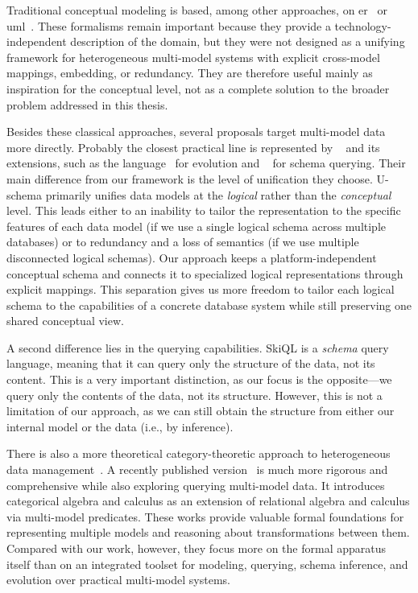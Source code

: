 Traditional conceptual modeling is based, among other approaches, on \acrshort{er}~\citep{ER} or \acrshort{uml}~\citep{UML}. These formalisms remain important because they provide a technology-independent description of the domain, but they were not designed as a unifying framework for heterogeneous multi-model systems with explicit cross-model mappings, embedding, or redundancy. They are therefore useful mainly as inspiration for the conceptual level, not as a complete solution to the broader problem addressed in this thesis.

Besides these classical approaches, several proposals target multi-model data more directly. Probably the closest practical line is represented by ~\citep{DBLP:journals/is/CandelRM22} and its extensions, such as the  language~\citep{DBLP:conf/er/ChillonRM21a, 10.1109/TKDE.2024.3362273} for evolution and ~\citep{skiql} for schema querying. Their main difference from our framework is the level of unification they choose. U-schema primarily unifies data models at the \emph{logical} rather than the \emph{conceptual} level. This leads either to an inability to tailor the representation to the specific features of each data model (if we use a single logical schema across multiple databases) or to redundancy and a loss of semantics (if we use multiple disconnected logical schemas). Our approach keeps a platform-independent conceptual schema and connects it to specialized logical representations through explicit mappings. This separation gives us more freedom to tailor each logical schema to the capabilities of a concrete database system while still preserving one shared conceptual view.

A second difference lies in the querying capabilities. SkiQL is a \emph{schema} query language, meaning that it can query only the structure of the data, not its content. This is a very important distinction, as our focus is the opposite---we query only the contents of the data, not its structure. However, this is not a limitation of our approach, as we can still obtain the structure from either our internal model or the data (i.e., by inference).

There is also a more theoretical category-theoretic approach to heterogeneous data management~\citep{DBLP:journals/corr/abs-2201-04905}. A recently published version~\citep{lu2025part1, lu2025part2} is much more rigorous and comprehensive while also exploring querying multi-model data. It introduces categorical algebra and calculus as an extension of relational algebra and calculus via multi-model predicates. These works provide valuable formal foundations for representing multiple models and reasoning about transformations between them. Compared with our work, however, they focus more on the formal apparatus itself than on an integrated toolset for modeling, querying, schema inference, and evolution over practical multi-model systems.

